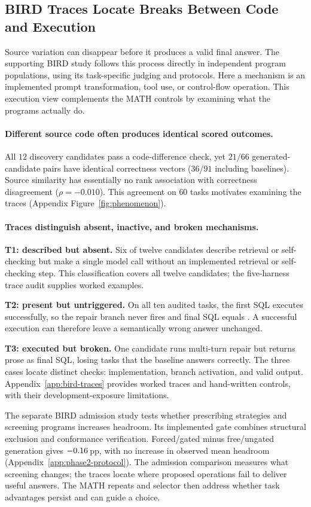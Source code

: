 \subsection{BIRD Traces Locate Breaks Between Code and Execution}\label{sec:supporting}\label{sec:f1-collapse}
Source variation can disappear before it produces a valid final answer.
The supporting BIRD study follows this process directly in independent
program populations, using its task-specific judging and protocols.
Here a mechanism is an implemented prompt transformation, tool use,
or control-flow operation. This execution view complements the
MATH controls by examining what the programs actually do.

\paragraph{Different source code often produces identical scored outcomes.}
All $12$ discovery candidates pass a code-difference check, yet
$21/66$ generated-candidate pairs have identical correctness vectors
($36/91$ including baselines). Source similarity has essentially no
rank association with correctness disagreement ($\rho=-0.010$).
This agreement on $60$ tasks motivates examining the traces
(Appendix Figure~\ref{fig:phenomenon}).

\paragraph{Traces distinguish absent, inactive, and broken mechanisms.}
\textbf{T1: described but absent.} Six of twelve candidates describe
retrieval or self-checking but make a single model call without an
implemented retrieval or self-checking step. This classification covers all twelve candidates;
the five-harness trace audit supplies worked examples.

\textbf{T2: present but untriggered.} On all ten audited \react{}
tasks, the first SQL executes successfully, so the repair branch
never fires and final SQL equals \bare{}. A successful execution
can therefore leave a semantically wrong answer unchanged.

\textbf{T3: executed but broken.} One candidate runs multi-turn
repair but returns prose as final SQL, losing tasks that the
baseline answers correctly. The three cases locate distinct checks:
implementation, branch activation, and valid output.
Appendix~\ref{app:bird-traces} provides worked traces and hand-written
controls, with their development-exposure limitations.

The separate BIRD admission study tests whether prescribing strategies
and screening programs increases headroom. Its implemented gate combines
structural exclusion and conformance verification. Forced/gated minus
free/ungated generation gives $-0.16$\,pp, with no
increase in observed mean headroom (Appendix~\ref{app:phase2-protocol}).
The admission comparison measures what screening changes; the traces
locate where proposed operations fail to deliver useful answers.
The MATH repeats and selector then address whether task advantages
persist and can guide a choice.
